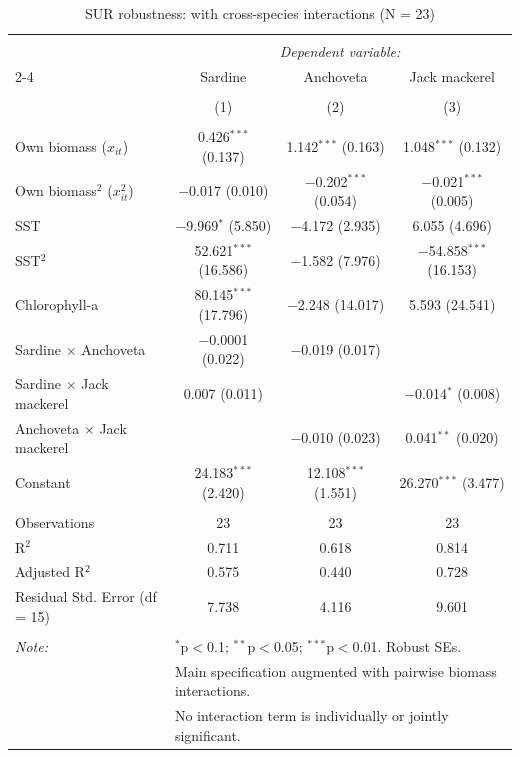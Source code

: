 \documentclass[
  11pt,
]{article}
\begin{document}
\begin{table}[!htbp] \centering 
  \caption{SUR robustness: with cross-species interactions (N = 23)} 
  \label{tab:SUR_interactions} 
\footnotesize 
\begin{tabular}{@{\extracolsep{5pt}}lccc} 
\\[-1.8ex]\hline 
\hline \\[-1.8ex] 
 & \multicolumn{3}{c}{\textit{Dependent variable:}} \\ 
\cline{2-4} 
 & Sardine & Anchoveta & Jack mackerel \\ 
\\[-1.8ex] & (1) & (2) & (3)\\ 
\hline \\[-1.8ex] 
 Own biomass ($x_{it}$) & 0.426$^{***}$ (0.137) & 1.142$^{***}$ (0.163) & 1.048$^{***}$ (0.132) \\ 
  Own biomass$^2$ ($x_{it}^2$) & $-$0.017 (0.010) & $-$0.202$^{***}$ (0.054) & $-$0.021$^{***}$ (0.005) \\ 
  SST & $-$9.969$^{*}$ (5.850) & $-$4.172 (2.935) & 6.055 (4.696) \\ 
  SST$^2$ & 52.621$^{***}$ (16.586) & $-$1.582 (7.976) & $-$54.858$^{***}$ (16.153) \\ 
  Chlorophyll-a & 80.145$^{***}$ (17.796) & $-$2.248 (14.017) & 5.593 (24.541) \\ 
  Sardine $\times$ Anchoveta & $-$0.0001 (0.022) & $-$0.019 (0.017) &  \\ 
  Sardine $\times$ Jack mackerel & 0.007 (0.011) &  & $-$0.014$^{*}$ (0.008) \\ 
  Anchoveta $\times$ Jack mackerel &  & $-$0.010 (0.023) & 0.041$^{**}$ (0.020) \\ 
  Constant & 24.183$^{***}$ (2.420) & 12.108$^{***}$ (1.551) & 26.270$^{***}$ (3.477) \\ 
 \hline \\[-1.8ex] 
Observations & 23 & 23 & 23 \\ 
R$^{2}$ & 0.711 & 0.618 & 0.814 \\ 
Adjusted R$^{2}$ & 0.575 & 0.440 & 0.728 \\ 
Residual Std. Error (df = 15) & 7.738 & 4.116 & 9.601 \\ 
\hline 
\hline \\[-1.8ex] 
\textit{Note:}  & \multicolumn{3}{l}{$^{*}$p$<$0.1; $^{**}$p$<$0.05; $^{***}$p$<$0.01. Robust SEs.} \\ 
 & \multicolumn{3}{l}{Main specification augmented with pairwise biomass interactions.} \\ 
 & \multicolumn{3}{l}{No interaction term is individually or jointly significant.} \\ 
\end{tabular} 
\end{table}
\end{document}

